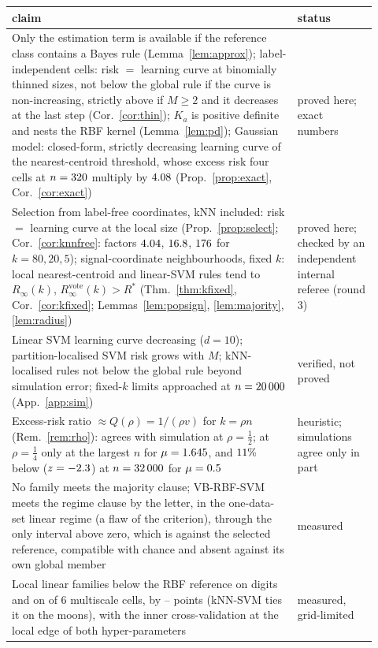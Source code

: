 \documentclass[11pt,a4paper]{article}
\theoremstyle{plain}
\theoremstyle{definition}
\theoremstyle{remark}
\newcommand{\Risk}{R}
\begin{document}
\begin{table}[tb]
\centering\small
\begin{tabular}{p{0.72\linewidth}>{\raggedright\arraybackslash}p{0.20\linewidth}}
\toprule
claim & status\\
\midrule
Only the estimation term is available if the reference class contains a Bayes rule (Lemma~\ref{lem:approx}); label-independent cells: risk $=$ learning curve at binomially thinned sizes, not below the global rule if the curve is non-increasing, strictly above if $M\ge2$ and it decreases at the last step (Cor.~\ref{cor:thin}); $K_a$ is positive definite and nests the RBF kernel (Lemma~\ref{lem:pd}); Gaussian model: closed-form, strictly decreasing learning curve of the nearest-centroid threshold, whose excess risk four cells at $n=320$ multiply by $4.08$ (Prop.~\ref{prop:exact}, Cor.~\ref{cor:exact}) & proved here; exact numbers\\
Selection from label-free coordinates, kNN included: risk $=$ learning curve at the local size (Prop.~\ref{prop:select}; Cor.~\ref{cor:knnfree}: factors $4.04$, $16.8$, $176$ for $k=80,20,5$); signal-coordinate neighbourhoods, fixed $k$: local nearest-centroid and linear-SVM rules tend to $\Risk_\infty(k)$, $\Risk^{\mathrm{vote}}_\infty(k)>\Risk^*$ (Thm.~\ref{thm:kfixed}, Cor.~\ref{cor:kfixed}; Lemmas~\ref{lem:popsign}, \ref{lem:majority}, \ref{lem:radius}) & proved here; checked by an independent internal referee (round 3)\\
Linear SVM learning curve decreasing ($d=10$); partition-localised SVM risk grows with $M$; kNN-localised rules not below the global rule beyond simulation error; fixed-$k$ limits approached at $n=20\,000$ (App.~\ref{app:sim}) & verified, not proved\\
Excess-risk ratio $\approx Q(\rho)=1/(\rho v)$ for $k=\rho n$ (Rem.~\ref{rem:rho}): agrees with simulation at $\rho=\tfrac12$; at $\rho=\tfrac14$ only at the largest $n$ for $\mu=1.645$, and $11\%$ below ($z=-2.3$) at $n=32\,000$ for $\mu=0.5$ & heuristic; simulations agree only in part\\
No family meets the majority clause; VB-RBF-SVM meets the regime clause by the letter, in the one-data-set linear regime (a flaw of the criterion), through the only interval above zero, which is against the selected reference, compatible with chance and absent against its own global member & measured\\
Local linear families below the RBF reference on digits and on \NNegLinLocalMulti{} of 6 multiscale cells, by \NegLinLocalMultiLoAbs{}--\NegLinLocalMultiHiAbs{} points (kNN-SVM ties it on the moons), with the inner cross-validation at the local edge of both hyper-parameters & measured, grid-limited\\

\end{tabular}
\end{table}
\end{document}
